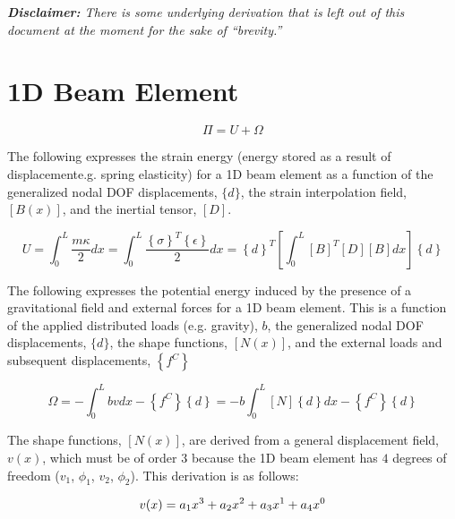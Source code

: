 \documentclass[a4paper]{article}
\begin{document}
\fontsize{12pt}{13pt}\selectfont

\textit{\textbf{Disclaimer:} There is some underlying derivation that is left out of this document at the moment for the sake of ``brevity.''}

\section{1D Beam Element}

\begin{equation*}
    \Pi = U + \Omega
\end{equation*}

The following expresses the strain energy (energy stored as a result of displacement\textemdash e.g. spring elasticity) for a 1D beam element as a function of the generalized nodal DOF displacements, $\{d\}$, the strain interpolation field, $\left[B(x)\right]$, and the inertial tensor, $\left[D\right]$.

\begin{equation*}
    U = \int_{0}^{L} \dfrac{m\kappa}{2} dx =
    \int_{0}^{L} \dfrac{\left\{\sigma\right\}^{T}\left\{\epsilon\right\}}{2} dx =
    \left\{d\right\}^{T} \left[ \int_{0}^{L} \left[B\right]^{T} \left[D\right] \left[B\right] dx \right] \left\{d\right\}
\end{equation*}

The following expresses the potential energy induced by the presence of a gravitational field and external forces for a 1D beam element. This is a function of the applied distributed loads (e.g. gravity), $b$, the generalized nodal DOF displacements, $\{d\}$, the shape functions, $\left[N(x)\right]$, and the external loads and subsequent displacements, $\left\{f^{C}\right\}$

\begin{equation*}
    \Omega = - \int_{0}^{L} bv dx - \left\{f^{C}\right\}\left\{d\right\} =
    -b \int_{0}^{L} \left[N\right]\left\{d\right\} dx - \left\{f^{C}\right\}\left\{d\right\}
\end{equation*}

The shape functions, $\left[N(x)\right]$, are derived from a general displacement field, $v(x)$, which must be of order $3$ because the 1D beam element has $4$ degrees of freedom ($v_{1}$, $\phi_{1}$, $v_{2}$, $\phi_{2}$). This derivation is as follows:

\begin{equation*}
v(x) = a_{1}x^{3} + a_{2}x^{2} + a_{3}x^{1} + a_{4}x^{0}\\
\end{equation*}
\end{document}
